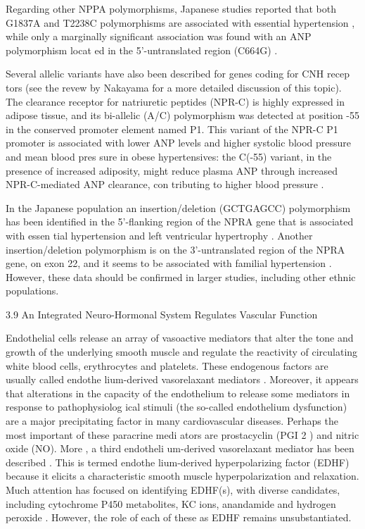 \documentclass[14pt,a4paper,onecolumn]{extarticle}
\begin{document}
Regarding other NPPA polymorphisms, Japanese studies reported that both G1837A and T2238C polymorphisms are associated with essential hypertension \citep{262}, while only a marginally significant association was found with an ANP polymorphism locat ed in the 5’-untranslated region (C664G) \citep{263}.

Several allelic variants have also been described for genes coding for CNH recep tors (see the  revew by Nakayama \citep{251} for a more detailed discussion of this topic). The clearance receptor for natriuretic peptides (NPR-C) is highly expressed in adipose tissue, and its bi-allelic (A/C) polymorphism was detected at position -55 in the conserved promoter element named P1. This variant of the NPR-C P1 promoter is associated with lower ANP levels and higher systolic blood pressure and mean blood pres sure in obese hypertensives: the C(-55) variant, in the presence of increased adiposity, might reduce plasma ANP through increased NPR-C-mediated ANP clearance, con tributing to higher blood pressure \citep{264}.

In the Japanese population an insertion/deletion (GCTGAGCC) polymorphism has been identified in the 5’-flanking region of the NPRA gene that is associated with essen tial hypertension and left ventricular hypertrophy \citep{265}. Another insertion/deletion polymorphism is on the 3’-untranslated region of the NPRA gene, on exon 22, and it seems to be associated with familial hypertension \citep{266}. However, these data should be confirmed in larger studies, including other ethnic populations.

3.9 An Integrated Neuro-Hormonal System Regulates Vascular Function

Endothelial cells release an array of vasoactive mediators that alter the tone and growth of the underlying smooth muscle and regulate the reactivity of circulating white blood cells, erythrocytes and platelets. These endogenous factors are usually called endothe lium-derived vasorelaxant mediators \citep{267}. Moreover, it appears that alterations in the capacity of the endothelium to release some mediators in response to pathophysiolog ical stimuli (the so-called endothelium dysfunction) are a major precipitating factor in many cardiovascular diseases. Perhaps the most important of these paracrine medi ators are prostacyclin (PGI 2 ) and nitric oxide (NO). More , a third endotheli um-derived vasorelaxant mediator has been described \citep{267}. This is termed endothe lium-derived hyperpolarizing factor (EDHF) because it elicits a characteristic smooth muscle hyperpolarization and relaxation. Much attention has focused on identifying EDHF(s), with diverse candidates, including cytochrome P450 metabolites, KC ions, anandamide and hydrogen peroxide \citep{267}. However, the role of each of these as EDHF remains unsubstantiated.
\end{document}
